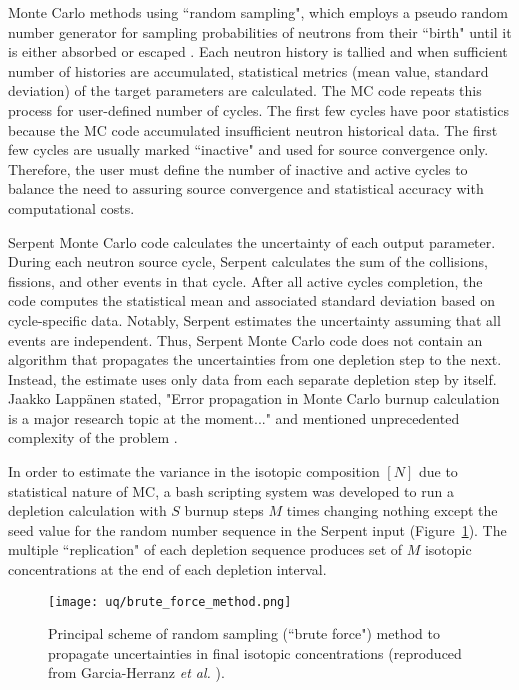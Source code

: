 Monte Carlo methods using ``random sampling", which employs a pseudo random 
number generator for sampling probabilities of neutrons from their ``birth" 
until it is either absorbed or escaped \cite{brown_fundamentals_2005}. Each 
neutron history is tallied and when sufficient number of histories are 
accumulated, statistical metrics (mean value, standard deviation) of the 
target parameters are calculated. The \gls{MC} code repeats this process for 
user-defined number of cycles. The first few cycles have poor statistics 
because the \gls{MC} code accumulated insufficient neutron historical data. 
The first few cycles are usually marked ``inactive" and used for source 
convergence only. Therefore, the user must define the number of inactive and 
active cycles to balance the need to assuring source convergence and 
statistical accuracy with computational costs.

Serpent Monte Carlo code calculates the uncertainty of each output parameter. 
During each neutron source cycle, Serpent calculates the sum of the 
collisions, fissions, and other events in that cycle. After all active cycles 
completion, the code computes the statistical mean and associated standard 
deviation based on cycle-specific data. Notably, Serpent estimates the 
uncertainty assuming that all events are independent. Thus, Serpent Monte 
Carlo code does not contain an algorithm that propagates the uncertainties 
from one depletion step to the next. Instead, the estimate uses only data from 
each separate depletion step by itself. Jaakko Lapp\"{a}nen stated, "Error 
propagation in Monte Carlo burnup calculation is a major research topic at the 
moment..." and mentioned unprecedented complexity of the problem 
\cite{leppanen_statistical_2012}.

In order to estimate the variance in the isotopic composition $[N]$ due to 
statistical nature of \gls{MC}, a bash scripting system was developed to run a 
depletion calculation with $S$ burnup steps $M$ times changing nothing except 
the seed value for the random number sequence in the Serpent input 
(Figure~\ref{fig:uq-brute-force}). The multiple ``replication" of each 
depletion sequence produces set of $M$ isotopic concentrations at the end of 
each depletion interval. 
\begin{figure}[hbp!] %
	\centering
	\texttt{[image: uq/brute\_force\_method.png]}
	\caption{Principal scheme of random sampling (``brute force") method to 
		propagate uncertainties in final isotopic concentrations (reproduced 
		from 
		Garcia-Herranz \emph{et al.} \cite{garcia-herranz_propagation_2008}).}
	\label{fig:uq-brute-force}
\end{figure}


